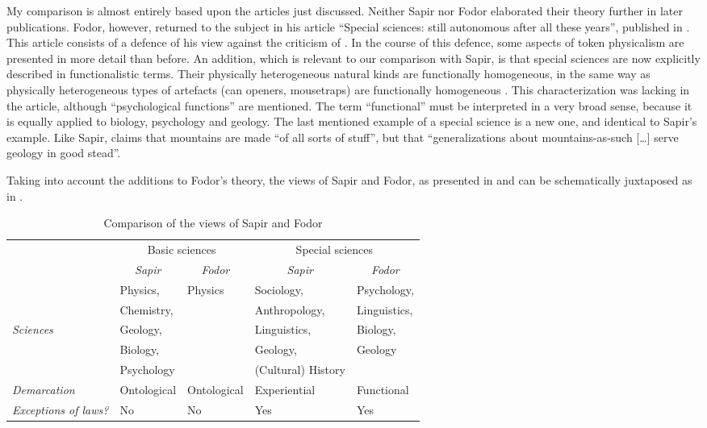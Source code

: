\documentclass[output=paper]{langscibook}
\begin{document}
My comparison is almost entirely based upon the articles just discussed. Neither Sapir nor Fodor elaborated their theory further in later publications. Fodor, however, returned to the subject in his article ``Special sciences: still autonomous after all these years'', published in \citeyear{Fodor1997}. This article consists of a defence of his view against the criticism of \citet{Kim1992}. In the course of this defence, some aspects of token physicalism are presented in more detail than before. An addition, which is relevant to our comparison with Sapir, is that special sciences are now explicitly described in functionalistic terms. Their physically heterogeneous natural kinds are functionally homogeneous, in the same way as physically heterogeneous types of artefacts (can openers, mousetraps) are functionally homogeneous \citep[160]{Fodor1997}. This characterization was lacking in the \citeyear{Fodor1974} article, although ``psychological functions'' are mentioned. The term ``functional'' must be interpreted in a very broad sense, because it is equally applied to biology, psychology and geology. The last mentioned example of a special science is a new one, and identical to Sapir's example. Like Sapir, \citet[160]{Fodor1997} claims that mountains are made ``of all sorts of stuff'', but that ``generalizations about mountains-as-such […] serve geology in good stead''.

Taking into account the \citeyear{Fodor1997} additions to Fodor's theory, the views of Sapir and Fodor, as presented in  and  can be schematically juxtaposed as in .

\begin{table}
\begin{tabular}{p{1.8cm} p{2.2cm} p{2.2cm} p{2.2cm} p{2.2cm}}
  \multirow{2}{*}{ } & \multicolumn{2}{c}{Basic sciences} & \multicolumn{2}{c}{Special sciences} \\
  & \multicolumn{1}{c}{\emph{Sapir}} & \multicolumn{1}{c}{\emph{Fodor}} & \multicolumn{1}{c}{\emph{Sapir}} & \multicolumn{1}{c}{\emph{Fodor}} \\ \midrule
  & Physics, & Physics & Sociology, & Psychology, \\
  & Chemistry, & & Anthropology, & Linguistics, \\
  \emph{Sciences} & Geology, & & Linguistics, & Biology, \\
  & Biology, & & Geology, & Geology  \\
  & Psychology & & {(}Cultural{)} History & \\ \midrule
 
 \emph{Demarcation} & Ontological & Ontological & Experiential & Functional \\ \midrule
 
 \emph{Exceptions of laws?} & No & No & Yes & Yes \\
\end{tabular}
\caption{Comparison of the views of Sapir and Fodor}
\label{tab:elffers:sciences}
\end{table}
\end{document}

